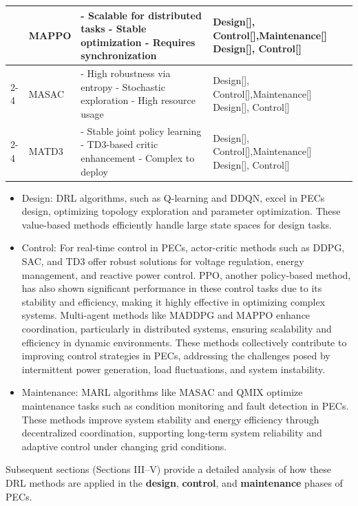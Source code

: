 \begin{table}[t]
\begin{tabular}{|l|l|p{8.2cm}|p{4.2cm}|}
& MAPPO & 
- Scalable for distributed tasks \newline
- Stable optimization \newline
- Requires synchronization 
& Design[], Control[],Maintenance[] \newline
Design[], Control[]
\\
\cline{2-4}

& MASAC & 
- High robustness via entropy \newline
- Stochastic exploration \newline
- High resource usage 
& Design[], Control[],Maintenance[] \newline
Design[], Control[]
\\
\cline{2-4}

& MATD3 & 
- Stable joint policy learning \newline
- TD3-based critic enhancement \newline
- Complex to deploy 
& Design[], Control[],Maintenance[] \newline
Design[], Control[]
\\
\hline
\end{tabular}
\end{table}


\begin{itemize}

  \item[$\bullet$] Design: DRL algorithms, such as Q-learning and DDQN, excel in PECs design, optimizing topology exploration and parameter optimization. These value-based methods efficiently handle large state spaces for design tasks. 

  \item[$\bullet$] Control: For real-time control in PECs, actor-critic methods such as DDPG, SAC, and TD3 offer robust solutions for voltage regulation, energy management, and reactive power control. PPO, another policy-based method, has also shown significant performance in these control tasks due to its stability and efficiency, making it highly effective in optimizing complex systems. Multi-agent methods like MADDPG and MAPPO enhance coordination, particularly in distributed systems, ensuring scalability and efficiency in dynamic environments. These methods collectively contribute to improving control strategies in PECs, addressing the challenges posed by intermittent power generation, load fluctuations, and system instability.

  \item[$\bullet$] Maintenance: MARL algorithms like MASAC and QMIX optimize maintenance tasks such as condition monitoring and fault detection in PECs. These methods improve system stability and energy efficiency through decentralized coordination, supporting long-term system reliability and adaptive control under changing grid conditions.

\end{itemize}

Subsequent sections (Sections III–V) provide a detailed analysis of how these DRL methods are applied in the \textbf{design}, \textbf{control}, and \textbf{maintenance} phases of PECs.
